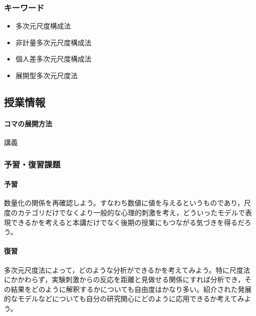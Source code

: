 \subsubsection{キーワード}
\begin{itemize}
    \item 多次元尺度構成法
    \item 非計量多次元尺度構成法
    \item 個人差多次元尺度構成法
    \item 展開型多次元尺度法
\end{itemize}
\subsection{授業情報}
\paragraph{コマの展開方法}
講義
\subsubsection{予習・復習課題}
\paragraph{予習}数量化の関係を再確認しよう。すなわち数値に値を与えるというものであり，尺度のカテゴリだけでなくより一般的な心理的刺激を考え，どういったモデルで表現できるかを考えると本講だけでなく後期の授業にもつながる気づきを得るだろう。
\paragraph{復習}多次元尺度法によって，どのような分析ができるかを考えてみよう。特に尺度法にかかわらず，実験刺激からの反応を距離と見做せる関係にすれば分析でき，その結果をどのように解釈するかについても自由度はかなり多い。紹介された発展的なモデルなどについても自分の研究関心にどのように応用できるか考えてみよう。